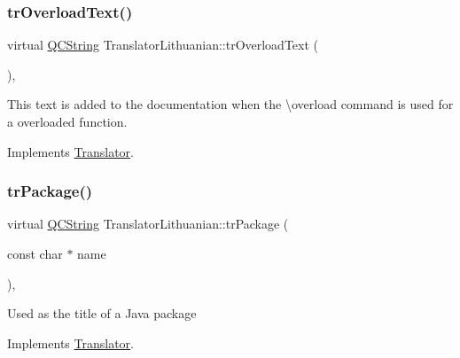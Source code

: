 \mbox{\label{class_translator_lithuanian_a81169c147054a292dc0d5064a3e705f8}} 
\subsubsection{\texorpdfstring{trOverloadText()}{trOverloadText()}}
{\footnotesize\ttfamily virtual \mbox{\hyperlink{class_q_c_string}{Q\+C\+String}} Translator\+Lithuanian\+::tr\+Overload\+Text (\begin{DoxyParamCaption}{ }\end{DoxyParamCaption})\hspace{0.3cm}{\ttfamily [inline]}, {\ttfamily [virtual]}}

This text is added to the documentation when the \textbackslash{}overload command is used for a overloaded function. 

Implements \mbox{\hyperlink{class_translator}{Translator}}.

\mbox{\label{class_translator_lithuanian_ada302430f5ded337419c23905575c035}} 
\subsubsection{\texorpdfstring{trPackage()}{trPackage()}}
{\footnotesize\ttfamily virtual \mbox{\hyperlink{class_q_c_string}{Q\+C\+String}} Translator\+Lithuanian\+::tr\+Package (\begin{DoxyParamCaption}\item[{const char $\ast$}]{name }\end{DoxyParamCaption})\hspace{0.3cm}{\ttfamily [inline]}, {\ttfamily [virtual]}}

Used as the title of a Java package 

Implements \mbox{\hyperlink{class_translator}{Translator}}.

\mbox{\label{class_translator_lithuanian_a1a249d46e9446095d968bd05f27cc36b}} 
